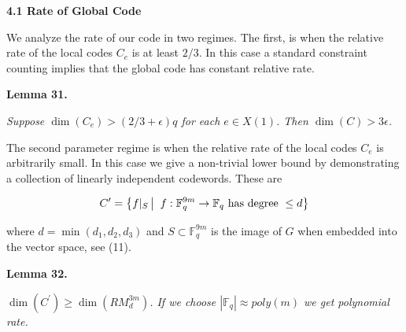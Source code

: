 \documentclass[10pt,a4paper]{article}
\begin{document}
\par\medskip\noindent\textbf{
4.1 Rate of Global Code}\par




We analyze the rate of our code in two regimes. The first, is when the relative rate of the local codes $C_{e}$ is at least $2/3$. In this case a standard constraint counting implies that the global code has constant relative rate.\par





\par\medskip\noindent\textbf{
\textbf{Lemma 31}\textbf{.}
}\par



\emph{Suppose $\dim(C_{e})>(2/3+\epsilon)q$ for each $e\in X(1)$. Then $\dim(C)>3\epsilon$.}\par






The second parameter regime is when the relative rate of the local codes $C_{e}$ is arbitrarily small. In this case we give a non-trivial lower bound by demonstrating a collection of linearly independent codewords. These are\par


\[\begin{gathered}
C^{\prime}=\left\{f|_{S}\left|\;\vphantom{f|_{S}f:\mathbb{F}_{q}^{9m}\to\mathbb{F}_{q}\hbox{ has degree }\leq d}\right.f:\mathbb{F}_{q}^{9m}\to\mathbb{F}_{q}\hbox{ has degree }\leq d\right\}
\end{gathered}\]


where $d=\min(d_{1},d_{2},d_{3})$ and $S\subset\mathbb{F}_{q}^{9m}$ is the image of $G$ when embedded into the vector space, see (11).\par





\par\medskip\noindent\textbf{
\textbf{Lemma 32}\textbf{.}
}\par



$\dim(C^{\prime})\geq\dim(RM_{d}^{3m})$\emph{. If we choose $|\mathbb{F}_{q}|\approx poly(m)$ we get polynomial rate.}\par
\end{document}

